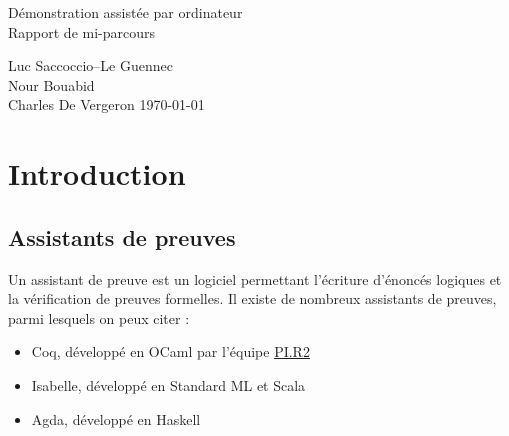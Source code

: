\documentclass[a4paper, 12pt]{article}
\begin{document}
\begin{titlepage}

    \begin{figure}
        \centering
        \vspace{8cm}
    \end{figure}

    \vspace{6cm}

    \begin{center}
        {\Huge Démonstration assistée par ordinateur\\}
        \vspace{0.5cm}
        {\huge Rapport de mi-parcours\\}

        \vspace{1.5cm}

        {\large Luc Saccoccio--Le Guennec\\ Nour Bouabid\\ Charles De Vergeron}
        \vfill
        {\large \today}
        \pagebreak
    \end{center}

\end{titlepage}

\tableofcontents

\newpage

\section{Introduction}

\subsection{Assistants de preuves}

Un assistant de preuve est un logiciel permettant l'écriture d'énoncés logiques et la vérification de preuves formelles. Il existe de nombreux assistants de preuves, parmi lesquels on peux citer :

\begin{itemize}
    \item Coq, développé en OCaml par l'équipe \href{http://www.pps.univ-paris-diderot.fr/pi.r2/}{PI.R2}
    \item Isabelle, développé en Standard ML et Scala
    \item Agda, développé en Haskell
\end{itemize}
\end{document}

